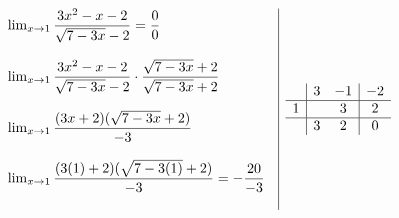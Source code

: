 \documentclass[12pt]{article}
\begin{document}
\[
\begin{array}{l|c}
  \begin{array}{l}
    \lim_{x \to 1} \dfrac{3x^2 - x - 2}{\sqrt{7-3x} - 2} = \dfrac{0}{0} \\\\
    \lim_{x \to 1} \dfrac{3x^2 - x - 2}{\sqrt{7-3x} - 2} \cdot \dfrac{\sqrt{7-3x} + 2}{\sqrt{7-3x} + 2} \\\\
    \lim_{x \to 1} \dfrac{(3x + 2)(\sqrt{7-3x} + 2)}{-3} \\\\
    \lim_{x \to 1} \dfrac{(3(1) + 2)(\sqrt{7-3(1)} + 2)}{-3} = -\dfrac{20}{-3} \\\\
  \end{array}
  &
  \begin{array}{c|c c|c}
    & 3 & -1 & -2 \\
    \hline
    1 &  & 3 & 2 \\
    \hline
    & 3 & 2 & 0 \\
  \end{array}
\end{array}
\]
\end{document}
